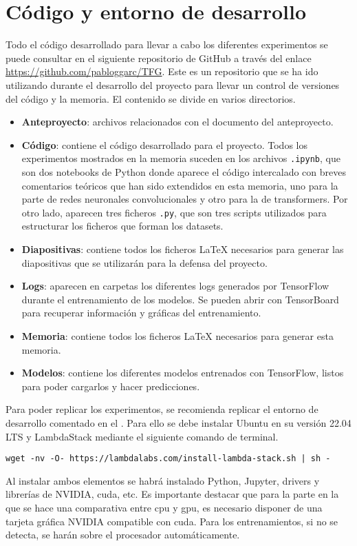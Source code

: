 \chapter{Código y entorno de desarrollo}

	Todo el código desarrollado para llevar a cabo los diferentes experimentos se puede consultar en el siguiente repositorio de GitHub a través del enlace \url{https://github.com/pabloggarc/TFG}. Este es un repositorio que se ha ido utilizando durante el desarrollo del proyecto para llevar un control de versiones del código y la memoria. El contenido se divide en varios directorios. 
	
	\begin{itemize}
		\item \textbf{Anteproyecto}: archivos relacionados con el documento del anteproyecto. 
		\item \textbf{Código}: contiene el código desarrollado para el proyecto. Todos los experimentos mostrados en la memoria suceden en los archivos \texttt{.ipynb}, que son dos notebooks de Python donde aparece el código intercalado con breves comentarios teóricos que han sido extendidos en esta memoria, uno para la parte de redes neuronales convolucionales y otro para la de transformers. Por otro lado, aparecen tres ficheros \texttt{.py}, que son tres scripts utilizados para estructurar los ficheros que forman los datasets. 
		\item \textbf{Diapositivas}: contiene todos los ficheros \LaTeX{} necesarios para generar las diapositivas que se utilizarán para la defensa del proyecto. 
		\item \textbf{Logs}: aparecen en carpetas los diferentes logs generados por TensorFlow durante el entrenamiento de los modelos. Se pueden abrir con TensorBoard para recuperar información y gráficas del entrenamiento. 
		\item \textbf{Memoria}: contiene todos los ficheros \LaTeX{} necesarios para generar esta memoria. 
		\item \textbf{Modelos}: contiene los diferentes modelos entrenados con TensorFlow, listos para poder cargarlos y hacer predicciones. 
	\end{itemize}
	
	Para poder replicar los experimentos, se recomienda replicar el entorno de desarrollo comentado en el . Para ello se debe instalar Ubuntu en su versión 22.04 LTS y LambdaStack mediante el siguiente comando de terminal. 
	\begin{center}
		\begin{BVerbatim}[tabsize = 0]
			wget -nv -O- https://lambdalabs.com/install-lambda-stack.sh | sh -
		\end{BVerbatim}
	\end{center}
	Al instalar ambos elementos se habrá instalado Python, Jupyter, drivers y librerías de NVIDIA, \gls{cuda}, etc. Es importante destacar que para la parte en la que se hace una comparativa entre \gls{cpu} y \gls{gpu}, es necesario disponer de una tarjeta gráfica NVIDIA compatible con \gls{cuda}. Para los entrenamientos, si no se detecta, se harán sobre el procesador automáticamente. \\
	
